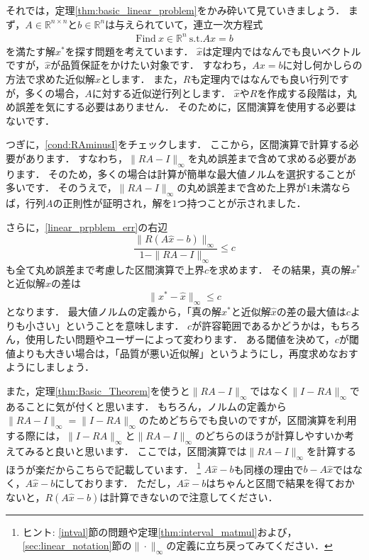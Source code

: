 それでは，定理\ref{thm:basic_linear_problem}をかみ砕いて見ていきましょう．
まず，$A \in {\mathbb R}^{n \times n} $と$b \in {\mathbb R}^n$は与えられていて，連立一次方程式
	\begin{align*}
		\mbox{Find} ~ x \in {\mathbb R}^n ~ \mbox{s.t.} A x = b
	\end{align*}
を満たす解$x^*$を探す問題を考えています．
$\hat{x}$は定理内ではなんでも良いベクトルですが，$\hat{x}$が品質保証をかけたい対象です．
すなわち，$Ax = b$に対し何かしらの方法で求めた近似解$\hat{x}$とします．
また，$R$も定理内ではなんでも良い行列ですが，多くの場合，$A$に対する近似逆行列とします．
$\hat{x}$や$R$を作成する段階は，丸め誤差を気にする必要はありません．
そのために，区間演算を使用する必要はないです．

つぎに，\eqref{cond:RAminusI}をチェックします．
ここから，区間演算で計算する必要があります．
すなわち，$\| RA - I  \|_{\infty}$を丸め誤差まで含めて求める必要があります．
そのため，多くの場合は計算が簡単な最大値ノルムを選択することが多いです．
そのうえで，$\| RA - I  \|_{\infty}$の丸め誤差まで含めた上界が$1$未満ならば，行列$A$の正則性が証明され，解を$1$つ持つことが示されました．

さらに，\eqref{linear_prpblem_err}の右辺
\[
	\frac{\|R(A\hat{x}-b)\|_{\infty}}{1-\|RA-I\|_{\infty}} \le c
\]
も全て丸め誤差まで考慮した区間演算で上界$c$を求めます．
その結果，真の解$x^*$と近似解$\hat{x}$の差は
\[
	\| x^* - \hat{x} \|_{\infty} \le c
\]
となります．
最大値ノルムの定義から，「真の解$x^*$と近似解$\hat{x}$の差の最大値は$c$よりも小さい」ということを意味します．
$c$が許容範囲であるかどうかは，もちろん，使用したい問題やユーザーによって変わります．
ある閾値を決めて，$c$が閾値よりも大きい場合は，「品質が悪い近似解」というようにし，再度求めなおすようにしましょう．

また，定理\ref{thm:Basic_Theorem}を使うと$\| RA - I  \|_{\infty}$ではなく$\| I - RA  \|_{\infty}$であることに気が付くと思います．
もちろん，ノルムの定義から$\| RA - I  \|_{\infty} = \| I - RA  \|_{\infty}$のためどちらでも良いのですが，区間演算を利用する際には，$\| I - RA \|_{\infty}$と$\| RA - I \|_{\infty}$のどちらのほうが計算しやすいか考えてみると良いと思います．
ここでは，区間演算では$\| RA - I  \|_{\infty}$を計算するほうが楽だからこちらで記載しています．
\footnote{ヒント: \ref{intval}節の問題や定理\ref{thm:interval_matmul}および，\ref{sec:linear_notation}節の$\| \cdot \|_{\infty}$の定義に立ち戻ってみてください．}
$A \hat{x} - b$も同様の理由で$b - A \hat{x}$ではなく，$A \hat{x} - b$にしております．
ただし，$A \hat{x} - b$はちゃんと区間で結果を得ておかないと，$R(A \hat{x} - b)$は計算できないので注意してください．




